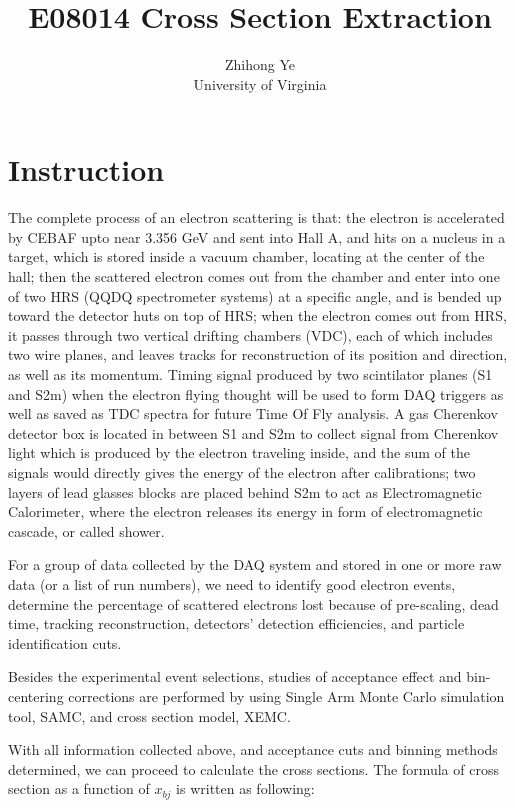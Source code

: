 \documentclass[a4paper,10.5pt]{article}
\title{E08014 Cross Section Extraction}
\author{Zhihong Ye\\ University of Virginia}
\begin{document}
\maketitle

\section{Instruction}

 The complete process of an electron scattering is that: the electron is accelerated by CEBAF upto near 3.356 GeV and sent into Hall A, and hits on a nucleus in a target, which is stored inside a vacuum chamber, locating at the center of the hall; then the scattered electron comes out from the chamber and enter into one of two HRS (QQDQ spectrometer systems) at a specific angle, and is bended up toward the detector huts on top of HRS; when the electron comes out from HRS, it passes through two vertical drifting chambers (VDC), each of which includes two wire planes, and leaves tracks for reconstruction of its position and direction, as well as its momentum. Timing signal produced by two scintilator planes (S1 and S2m) when the electron flying thought will be used to form DAQ triggers as well as saved as TDC spectra for future Time Of Fly analysis. A gas Cherenkov detector box is located in between S1 and S2m to collect signal from Cherenkov light which is produced by the electron traveling inside, and the 
sum of the signals would directly gives the energy of the electron after calibrations; two layers of lead glasses blocks are placed behind S2m to act as Electromagnetic Calorimeter, where the electron releases its energy in form of electromagnetic cascade, or called shower.

For a group of data collected by the DAQ system and stored in one or more raw data (or a list of run numbers), we need to identify good electron events, determine the percentage of scattered electrons lost because of pre-scaling, dead time, tracking reconstruction, detectors' detection efficiencies, and particle identification cuts. 

Besides the experimental event selections, studies of acceptance effect and bin-centering corrections are performed by using Single Arm Monte Carlo simulation tool, SAMC, and cross section model, XEMC.

With all information collected above, and acceptance cuts and binning methods determined, we can proceed to calculate the cross sections. The formula of cross section as a function of $x_{bj}$ is written as following:
\end{document}

